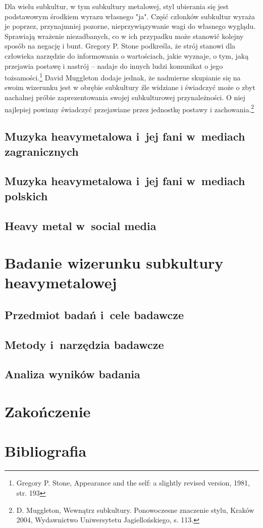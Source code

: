 \documentclass[12pt, a4paper, titlepage]{report}
\begin{document}
Dla wielu subkultur, w tym subkultury metalowej, styl ubierania się jest podstawowym środkiem wyrazu własnego "ja". Część członków subkultur wyraża je poprzez, przynajmniej pozorne, nieprzywiązywanie wagi do własnego wyglądu. Sprawiają wrażenie niezadbanych, co w ich przypadku może stanowić kolejny sposób na negację i bunt. Gregory P. Stone podkreśla, że strój stanowi dla człowieka narzędzie do informowania o wartościach, jakie wyznaje, o tym, jaką przejawia postawę i nastrój -- nadaje do innych ludzi komunikat o jego tożsamości.\footnote{Gregory P. Stone, Appearance and the self: a slightly revised version, 1981, str. 193} David Muggleton dodaje jednak, że nadmierne skupianie się na swoim wizerunku jest w obrębie subkultury źle widziane i świadczyć może o zbyt nachalnej próbie zaprezentowania swojej subkulturowej przynależności. O niej najlepiej powinny świadczyć przejawiane przez jednostkę postawy i zachowania.\footnote{D. Muggleton, Wewnątrz subkultury. Ponowoczesne znaczenie stylu, Kraków 2004, Wydawnictwo Uniwersytetu Jagiellońskiego, s. 113.}
\section{Muzyka heavymetalowa i~jej fani w~mediach zagranicznych}
\section{Muzyka heavymetalowa i~jej fani w~mediach polskich}
\section{Heavy metal w~social media}
\chapter{Badanie wizerunku subkultury heavymetalowej}
\section{Przedmiot badań i~cele badawcze}
\section{Metody i~narzędzia badawcze}
\section{Analiza wyników badania}
\chapter*{Zakończenie}
\chapter*{Bibliografia}
\end{document}

